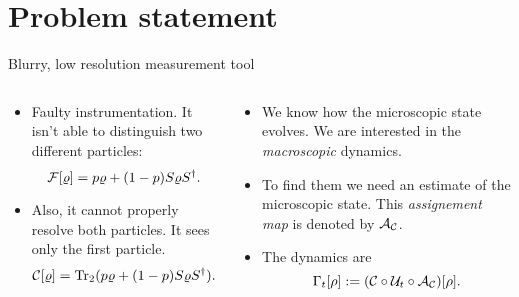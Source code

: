 \section{Problem statement}
\begin{frame}{Blurry, low resolution measurement tool}
    \begin{columns}
        \begin{column}{0.5\textwidth}
            \begin{itemize}
                \item  Faulty instrumentation. It isn't able to distinguish two different particles:
                \begin{equation*}
                    \mathcal{F}[\varrho]=p\varrho+(1-p)S\varrho S^{\dag}.
                \end{equation*}
                \item Also, it cannot properly resolve both particles. It sees only the first particle.
                \begin{equation*}
                    \mathcal{C}[\varrho]=\Tr_{2}(p\varrho+(1-p)S\varrho S^{\dag}).
                \end{equation*}
            \end{itemize}
        \end{column}
        \begin{column}{0.5\textwidth}
            \begin{itemize}
                \item We know how the microscopic state evolves. We are interested in the \textit{macroscopic} dynamics.
                \item To find them we need an estimate of the microscopic state. This \textit{assignement map} is denoted by $\mathcal{A}_{\mathcal{C}}$. 
                \item The dynamics are
                \begin{equation*}
                    \Gamma_t[\rho]:=(\mathcal{C} \circ \mathcal{U}_t \circ \mathcal{A}_{\mathcal{C}})[\rho].
                \end{equation*}
            \end{itemize}
        \end{column}
    \end{columns}
\end{frame}